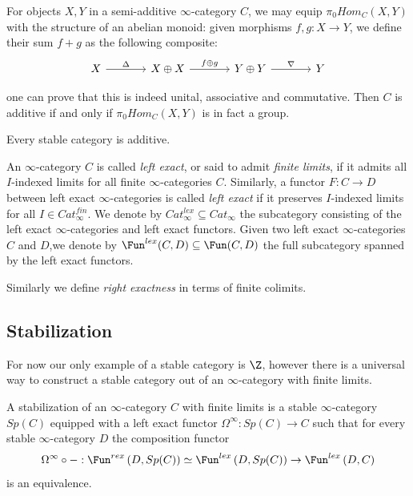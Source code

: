 \begin{remark}
    For objects $X,Y$ in a semi-additive $\infty$-category $C$, we may equip $\pi_0 Hom_C(X,Y)$
with the structure of an abelian monoid: given morphisms $f,g: X \to Y$, we define their sum $f +g$
as the following composite:
\[\begin{tikzcd}[sep=scriptsize]
	{X} && {X\oplus X} && {Y\oplus Y} && Y
	\arrow["\Delta", from=1-1, to=1-3]
	\arrow["{f\oplus g}", from=1-3, to=1-5]
	\arrow["\nabla", from=1-5, to=1-7]
\end{tikzcd}\]

one can prove that this is indeed unital, associative and commutative. Then
$C$ is additive if and only if $\pi_0 Hom_C(X,Y)$ is in fact a group.
\end{remark}

\begin{proposition}
    Every stable category is additive.
\end{proposition}

\begin{definition} An $\infty$-category $C$ is called \emph{left exact}, or said to admit
\emph{finite limits}, if it admits all $I$-indexed limits for all finite $\infty$-categories $C$. Similarly, a functor
$F: C \to D$ between left exact $\infty$-categories is called \emph{left exact} if it preserves $I$-indexed limits for all
$I\in Cat^{fin}_\infty$. We denote by
$Cat^{lex}_\infty \subseteq Cat_\infty$
the subcategory consisting of the left exact $\infty$-categories and left exact functors. Given two left
exact $\infty$-categories $C$ and $D$,we denote by
$\Fun^{lex} (C,D) \subseteq \Fun(C,D)$
the full subcategory spanned by the left exact functors.

Similarly we define \emph{right exactness} in terms of finite colimits.
\end{definition}
\subsection{Stabilization}

For now our only example of a stable category is $\mathcal{\Z}$, however there is a universal way to construct a stable category out of an $\infty$-category with finite limits.

\begin{definition}[stabilization]
A stabilization of an $\infty$-category $C$ with finite limits is a stable $\infty$-category $Sp(C)$
equipped with a left exact functor $\Omega^\infty: Sp(C)\to C$ such that for every stable $\infty$-category $D$ the
composition functor
\[\Omega^\infty\circ-: \Fun^{rex}\left(D,Sp(C)\right)\simeq\Fun^{lex}\left(D,Sp(C)\right)\to\Fun^{lex}\left(D,C\right)\]
is an equivalence.
\end{definition}

